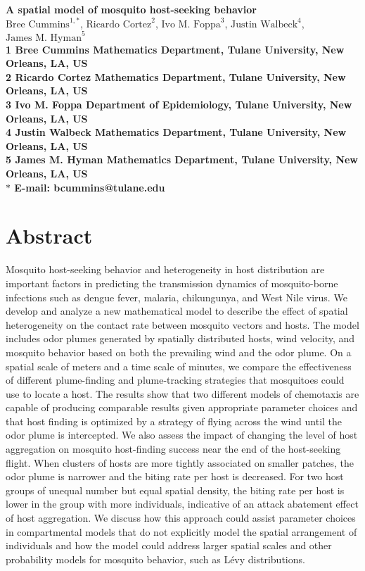\documentclass[10pt]{article}
\date{}
\begin{document}
\begin{flushleft}
{\Large
\textbf{A spatial model of mosquito host-seeking behavior}
}
\\
$\mbox{Bree Cummins}^{1,\ast}$,
$\mbox{Ricardo Cortez}^{2}$,
$\mbox{Ivo M. Foppa}^{3}$,
$\mbox{Justin Walbeck}^{4}$,
$\mbox{James M. Hyman}^{5}$
\\
\bf{1} Bree Cummins Mathematics Department, Tulane University, New Orleans, LA, US
\\
\bf{2} Ricardo Cortez Mathematics Department, Tulane University, New Orleans, LA, US
\\
\bf{3} Ivo M. Foppa Department of Epidemiology, Tulane University, New Orleans, LA, US
\\
\bf{4} Justin Walbeck Mathematics Department, Tulane University, New Orleans, LA, US
\\
\bf{5} James M. Hyman Mathematics Department, Tulane University, New Orleans, LA, US
\\
$\ast$ E-mail: bcummins@tulane.edu
\end{flushleft}


\section*{Abstract}
Mosquito host-seeking behavior and heterogeneity in host distribution are important factors
in predicting the transmission dynamics of mosquito-borne infections such as dengue fever, malaria, chikungunya, and West Nile virus. 
We develop and analyze a new mathematical model to describe the effect of spatial
heterogeneity on the contact rate between mosquito vectors and hosts. The model includes odor 
plumes generated by spatially distributed hosts, wind velocity,
and mosquito behavior based on both the prevailing wind and the odor plume.
On a spatial scale of meters and a time scale of minutes, we compare the effectiveness of different plume-finding and plume-tracking strategies that mosquitoes could use to locate a host. The results show that two different models of chemotaxis are capable of producing comparable results given appropriate parameter choices and that host finding is optimized by a strategy of flying across the wind until the odor plume is intercepted.  
We also assess the impact of changing the level of host aggregation on mosquito host-finding success near the end of the host-seeking flight.
When clusters of hosts are more tightly associated on smaller patches, the odor plume is narrower and the biting rate per host is decreased. For two host groups of unequal number but equal spatial density, the biting rate per host is lower in the group with more individuals, indicative of an attack abatement effect of host aggregation. 
We discuss how this approach could assist parameter choices in compartmental models that do not explicitly model the spatial arrangement of individuals and how the model could address larger spatial scales and other probability models for mosquito behavior, such as L\'{e}vy distributions.
\end{document}
